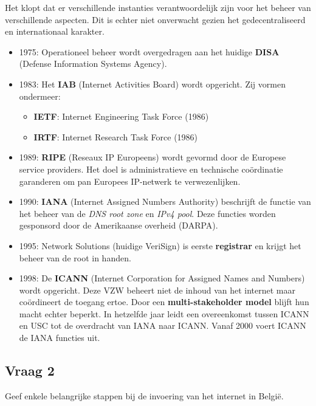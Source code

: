 \documentclass[../main.tex]{subfiles}
\begin{document}
\begin{solution}
Het klopt dat er verschillende instanties verantwoordelijk zijn voor het beheer van verschillende aspecten. Dit is echter niet onverwacht gezien het gedecentraliseerd en internationaal karakter.
\begin{itemize}
	\item 1975: Operationeel beheer wordt overgedragen aan het huidige \textbf{DISA} (Defense Information Systems Agency).
	\item 1983: Het \textbf{IAB} (Internet Activities Board) wordt opgericht. Zij vormen ondermeer:
	\begin{itemize}
		\item \textbf{IETF}: Internet Engineering Task Force (1986)
		\item \textbf{IRTF}: Internet Research Task Force (1986)
	\end{itemize}
	\item 1989: \textbf{RIPE} (Reseaux IP Europeens) wordt gevormd door de Europese service providers. Het doel is administratieve en technische coördinatie garanderen om pan Europees IP-netwerk te verwezenlijken.
	\item 1990: \textbf{IANA} (Internet Assigned Numbers Authority) beschrijft de functie van het beheer van de \emph{DNS root zone} en \emph{IPv4 pool}. Deze functies worden gesponsord door de Amerikaanse overheid (DARPA).
	\item 1995: Network Solutions (huidige VeriSign) is eerste \textbf{registrar} en krijgt het beheer van de root in handen.
	\item 1998: De \textbf{ICANN} (Internet Corporation for Assigned Names and Numbers) wordt opgericht. Deze VZW beheert niet de inhoud van het internet maar co\"ordineert de toegang ertoe. Door een \textbf{multi-stakeholder model} blijft hun macht echter beperkt. In hetzelfde jaar leidt een overeenkomst tussen ICANN en USC tot de overdracht van IANA naar ICANN. Vanaf 2000 voert ICANN de IANA functies uit.
\end{itemize}
\end{solution}



\subsection{Vraag 2}
\begin{question}
Geef enkele belangrijke stappen bij de invoering van het internet in België.
\end{question}

\begin{solution}

\end{solution}
\end{document}
